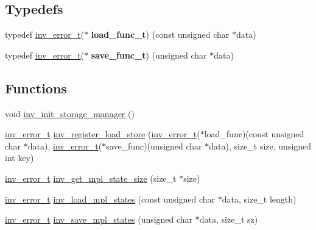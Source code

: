 \subsection*{Typedefs}
\begin{DoxyCompactItemize}
\item 
\hypertarget{group___storage___manager_ga177be890c8c5075c74c85ca4f999a61e}{}typedef \hyperlink{structinv__error__t}{inv\+\_\+error\+\_\+t}($\ast$ {\bfseries load\+\_\+func\+\_\+t}) (const unsigned char $\ast$data)\label{group___storage___manager_ga177be890c8c5075c74c85ca4f999a61e}

\item 
\hypertarget{group___storage___manager_gae647fba3c99b29ec121912dd87856779}{}typedef \hyperlink{structinv__error__t}{inv\+\_\+error\+\_\+t}($\ast$ {\bfseries save\+\_\+func\+\_\+t}) (unsigned char $\ast$data)\label{group___storage___manager_gae647fba3c99b29ec121912dd87856779}

\end{DoxyCompactItemize}
\subsection*{Functions}
\begin{DoxyCompactItemize}
\item 
void \hyperlink{group___storage___manager_ga742a7f04b77a48b55db9c246a5959c21}{inv\+\_\+init\+\_\+storage\+\_\+manager} ()
\item 
\hyperlink{structinv__error__t}{inv\+\_\+error\+\_\+t} \hyperlink{group___storage___manager_ga9d663c91712d9d409afca1237a2fe7a5}{inv\+\_\+register\+\_\+load\+\_\+store} (\hyperlink{structinv__error__t}{inv\+\_\+error\+\_\+t}($\ast$load\+\_\+func)(const unsigned char $\ast$data), \hyperlink{structinv__error__t}{inv\+\_\+error\+\_\+t}($\ast$save\+\_\+func)(unsigned char $\ast$data), size\+\_\+t size, unsigned int key)
\item 
\hyperlink{structinv__error__t}{inv\+\_\+error\+\_\+t} \hyperlink{group___storage___manager_ga03fa3e1879a249790c221ee198a4123d}{inv\+\_\+get\+\_\+mpl\+\_\+state\+\_\+size} (size\+\_\+t $\ast$size)
\item 
\hyperlink{structinv__error__t}{inv\+\_\+error\+\_\+t} \hyperlink{group___storage___manager_ga03e5346d03ba3104b415a1cfc2916dea}{inv\+\_\+load\+\_\+mpl\+\_\+states} (const unsigned char $\ast$data, size\+\_\+t length)
\item 
\hyperlink{structinv__error__t}{inv\+\_\+error\+\_\+t} \hyperlink{group___storage___manager_ga41944d4d55fcde98f998a1a31f6412b2}{inv\+\_\+save\+\_\+mpl\+\_\+states} (unsigned char $\ast$data, size\+\_\+t sz)
\end{DoxyCompactItemize}


